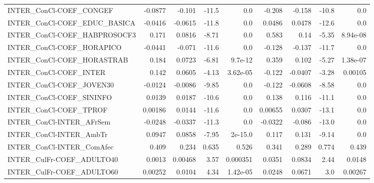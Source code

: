 \begin{tabular}{lrrrrrrrr}
INTER\_ConCl-COEF\_CONGEF                &     -0.0877 &       -0.101 &    -11.5 &      0.0 &     -0.208 &      -0.158 &        -10.8 &           0.0 \\
INTER\_ConCl-COEF\_EDUC\_BASICA           &     -0.0416 &      -0.0615 &    -11.8 &      0.0 &     0.0486 &      0.0478 &        -12.6 &           0.0 \\
INTER\_ConCl-COEF\_HABPROSOCF3           &       0.171 &       0.0816 &    -8.71 &      0.0 &      0.583 &        0.14 &        -5.35 &      8.94e-08 \\
INTER\_ConCl-COEF\_HORAPICO              &     -0.0441 &       -0.071 &    -11.6 &      0.0 &     -0.128 &      -0.137 &        -11.7 &           0.0 \\
INTER\_ConCl-COEF\_HORASTRAB             &       0.184 &       0.0723 &    -6.81 &  9.7e-12 &      0.359 &       0.102 &        -5.27 &      1.38e-07 \\
INTER\_ConCl-COEF\_INTER                 &       0.142 &       0.0605 &    -4.13 & 3.62e-05 &     -0.122 &     -0.0407 &        -3.28 &       0.00105 \\
INTER\_ConCl-COEF\_JOVEN30               &     -0.0124 &      -0.0086 &    -9.85 &      0.0 &     -0.122 &     -0.0608 &        -8.58 &           0.0 \\
INTER\_ConCl-COEF\_SININFO               &      0.0139 &       0.0187 &    -10.6 &      0.0 &      0.138 &       0.116 &        -11.1 &           0.0 \\
INTER\_ConCl-COEF\_TPROF                 &     0.00186 &       0.0144 &    -11.6 &      0.0 &    0.00655 &      0.0307 &        -13.1 &           0.0 \\
INTER\_ConCl-INTER\_AFrSem               &     -0.0248 &      -0.0337 &    -11.3 &      0.0 &    -0.0322 &      -0.086 &        -13.0 &           0.0 \\
INTER\_ConCl-INTER\_AmbTr                &      0.0947 &       0.0858 &    -7.95 &  2e-15.0 &      0.117 &       0.131 &        -9.14 &           0.0 \\
INTER\_ConCl-INTER\_ComAfec              &       0.409 &        0.234 &    0.635 &    0.526 &      0.341 &       0.289 &        0.774 &         0.439 \\
INTER\_CulFr-COEF\_ADULTO40              &      0.0013 &      0.00468 &     3.57 & 0.000351 &     0.0351 &      0.0834 &         2.44 &        0.0148 \\
INTER\_CulFr-COEF\_ADULTO60              &     0.00252 &       0.0104 &     4.34 & 1.42e-05 &     0.0248 &      0.0671 &          3.0 &       0.00267 \\

\end{tabular}
